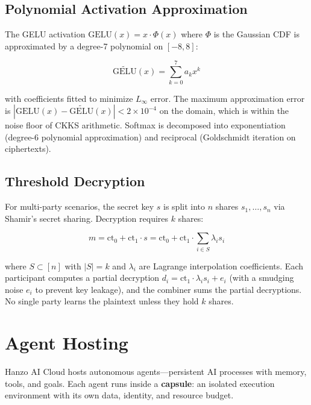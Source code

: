 \documentclass[11pt]{article}
\begin{document}
\subsection{Polynomial Activation Approximation}

The GELU activation $\text{GELU}(x) = x \cdot \Phi(x)$ where $\Phi$ is the
Gaussian CDF is approximated by a degree-7 polynomial on $[-8, 8]$:

\begin{equation}
\widetilde{\text{GELU}}(x) = \sum_{k=0}^{7} a_k x^k
\end{equation}

with coefficients fitted to minimize $L_\infty$ error. The maximum
approximation error is $|\text{GELU}(x) - \widetilde{\text{GELU}}(x)| <
2 \times 10^{-4}$ on the domain, which is within the noise floor of CKKS
arithmetic. Softmax is decomposed into exponentiation (degree-6 polynomial
approximation) and reciprocal (Goldschmidt iteration on ciphertexts).

\subsection{Threshold Decryption}

For multi-party scenarios, the secret key $s$ is split into $n$ shares
$s_1, \ldots, s_n$ via Shamir's secret sharing. Decryption requires $k$
shares:

\begin{equation}
m = \text{ct}_0 + \text{ct}_1 \cdot s = \text{ct}_0 +
\text{ct}_1 \cdot \sum_{i \in S} \lambda_i s_i
\end{equation}

where $S \subset [n]$ with $|S| = k$ and $\lambda_i$ are Lagrange
interpolation coefficients. Each participant computes a partial decryption
$d_i = \text{ct}_1 \cdot \lambda_i s_i + e_i$ (with a smudging noise $e_i$
to prevent key leakage), and the combiner sums the partial decryptions. No
single party learns the plaintext unless they hold $k$ shares.

\section{Agent Hosting}
\label{sec:agents}

Hanzo AI Cloud hosts autonomous agents---persistent AI processes with memory,
tools, and goals. Each agent runs inside a \textbf{capsule}: an isolated
execution environment with its own data, identity, and resource budget.
\end{document}
